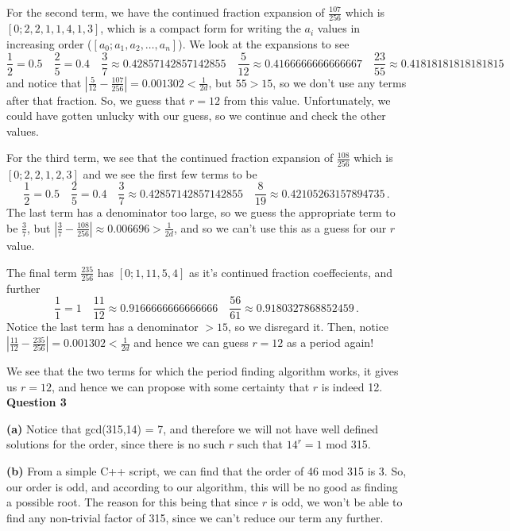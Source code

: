 \documentclass[10pt]{article}
\newcommand{\Que}[1]{\textbf{Question #1}}
\begin{document}
For the second term, we have the continued fraction expansion of $\frac{107}{256}$ which is $[0; 2, 2, 1, 1, 4, 1, 3]$, which is a compact form for writing the $a_{i}$ values in increasing order ($[a_{0};a_{1},a_{2},\dots,a_{n}]$). We look at the expansions to see
\[ \frac{1}{2} = 0.5 \quad \frac{2}{5} = 0.4 \quad \frac{3}{7} \approx 0.42857142857142855 \quad \frac{5}{12} \approx 0.4166666666666667 \quad \frac{23}{55} \approx 0.41818181818181815\]
and notice that $| \frac{5}{12} - \frac{107}{256}| = 0.001302 < \frac{1}{2d}$, but $55 > 15$, so we don't use any terms after that fraction. So, we guess that $r=12$ from this value. Unfortunately, we could have gotten unlucky with our guess, so we continue and check the other values.

For the third term, we see that the continued fraction expansion of $\frac{108}{256}$ which is $[0; 2, 2, 1, 2, 3]$ and we see the first few terms to be
\[ \frac{1}{2} = 0.5 \quad \frac{2}{5} = 0.4 \quad \frac{3}{7} \approx 0.42857142857142855 \quad \frac{8}{19} \approx 0.42105263157894735 \, .\]
The last term has a denominator too large, so we guess the appropriate term to be $\frac{3}{7}$, but $|\frac{3}{7} - \frac{108}{256}| \approx 0.006696 > \frac{1}{2d}$, and so we can't use this as a guess for our $r$ value.

The final term $\frac{235}{256}$ has $[0; 1, 11, 5, 4]$ as it's continued fraction coeffecients, and further
\[ \frac{1}{1} = 1 \quad \frac{11}{12} \approx 0.9166666666666666 \quad \frac{56}{61} \approx 0.9180327868852459 \, .\]
Notice the last term has a denominator $> 15$, so we disregard it. Then, notice $|\frac{11}{12} - \frac{235}{256}| = 0.001302 < \frac{1}{2d}$ and hence we can guess $r = 12$ as a period again!

We see that the two terms for which the period finding algorithm works, it gives us $r=12$, and hence we can propose with some certainty that $r$ is indeed 12.
\newpage
\Que{3}

\textbf{(a)} Notice that gcd(315,14) = 7, and therefore we will not have well defined solutions for the order, since there is no such $r$ such that $14^{r} = 1$ mod 315.

\textbf{(b)} From a simple C++ script, we can find that the order of 46 mod 315 is 3. So, our order is odd, and according to our algorithm, this will be no good as finding a possible root. The reason for this being that since $r$ is odd, we won't be able to find any non-trivial factor of 315, since we can't reduce our term any further.
\end{document}
